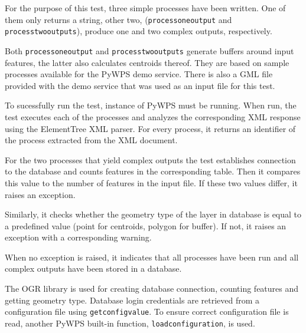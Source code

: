 For the purpose of this test, three simple processes have been written. One of them only returns a string, other two, (\texttt{process\textunderscore one\textunderscore output} and \texttt{process\textunderscore two\textunderscore outputs}), produce one and two complex outputs, respectively. 

Both \texttt{process\textunderscore one\textunderscore output} and \texttt{process\textunderscore two\textunderscore outputs} generate buffers around input features, the latter also calculates centroids thereof. They are based on sample processes available for the PyWPS demo service. There is also a GML file provided with the demo service that was used as an input file for this test.  

To sucessfully run the test, instance of PyWPS must be running. When run, the test executes each of the processes and analyzes the corresponding XML response using the ElementTree XML parser. For every process, it returns an identifier of the process extracted from the XML document. 

For the two processes that yield complex outputs the test establishes connection to the database and counts features in the corresponding table. Then it compares this value to the number of features in the input file. If these two values differ, it raises an exception.

Similarly, it checks whether the geometry type of the layer in database is equal to a predefined value (point for centroids, polygon for buffer). If not, it raises an exception with a corresponding warning. 

When no exception is raised, it indicates that all processes have been run and all complex outputs have been stored in a database.

The OGR library is used for creating database connection, counting features and getting geometry type. Database login credentials are retrieved from a configuration file using \texttt{get\textunderscore config\textunderscore value}. To ensure correct configuration file is read, another PyWPS built-in function, \texttt{load\textunderscore configuration}, is used.







